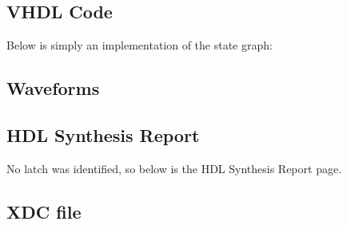 \documentclass{report}
\begin{document}
\subsection{VHDL Code}
Below is simply an implementation of the state graph:


\subsection{Waveforms}

\subsection{HDL Synthesis Report}
No latch was identified, so below is the HDL Synthesis Report page.


\subsection{XDC file}
\end{document}
